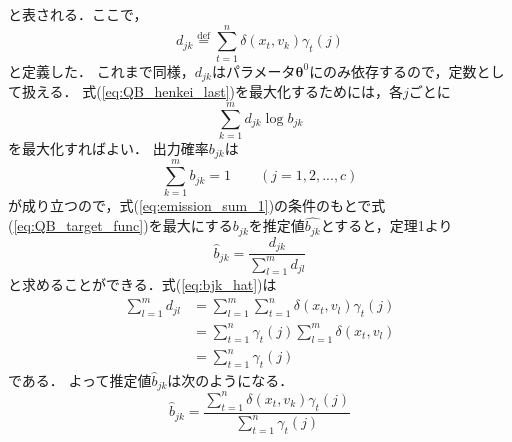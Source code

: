 \documentclass[a4j]{jarticle}
\begin{document}
と表される．ここで，
\begin{equation}
d_{jk} \overset{\mathrm{def}}{=} \sum_{t=1}^{n} \delta (x_{t}, v_{k}) \gamma_{t}(j)
\end{equation}
と定義した．
これまで同様，$d_{jk}$はパラメータ$\bm{\theta}^{0}$にのみ依存するので，定数として扱える．
式(\ref{eq:QB_henkei_last})を最大化するためには，各$j$ごとに
\begin{equation}
\sum^{m}_{k=1} d_{jk} \log b_{jk} \label{eq:QB_target_func}
\end{equation}
を最大化すればよい．
出力確率$b_{jk}$は
\begin{equation}
\sum^{m}_{k=1} b_{jk} = 1 \qquad (j = 1,2,...,c) \label{eq:emission_sum_1}
\end{equation}
が成り立つので，式(\ref{eq:emission_sum_1})の条件のもとで式(\ref{eq:QB_target_func})を最大にする$b_{jk}$を推定値$\hat{b_{jk}}$とすると，定理1より
\begin{equation}
\hat{b}_{jk} = \frac{d_{jk}}{\displaystyle \sum_{l=1}^{m} d_{jl}} \label{eq:bjk_hat}
\end{equation}
と求めることができる．式(\ref{eq:bjk_hat})は
\begin{align}
 \sum_{l=1}^{m} d_{jl}  & = \sum_{l=1}^{m}\sum_{t=1}^{n} \delta(x_{t}, v_{l}) \gamma_{t}(j) \\
 & = \sum_{t=1}^{n} \gamma_{t}(j) \sum_{l=1}^{m} \delta(x_{t}, v_{l}) \\
 & =  \sum_{t=1}^{n} \gamma_{t}(j)
\end{align}
である．
よって推定値$\hat{b}_{jk}$は次のようになる．
\begin{equation}
\hat{b}_{jk} = \frac{\displaystyle \sum_{t=1}^{n} \delta (x_{t}, v_{k}) \gamma_{t}(j)}{\displaystyle \sum_{t=1}^{n} \gamma_{t}(j)}
\end{equation}
\end{document}
